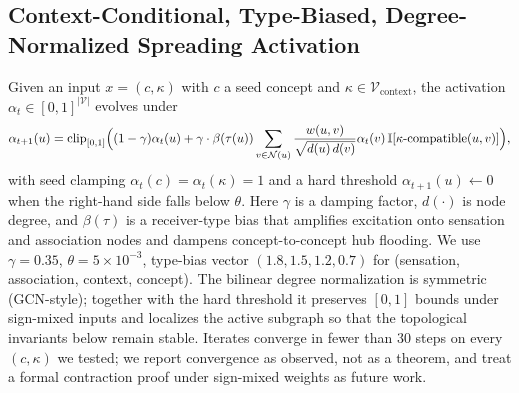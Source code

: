 \documentclass{article}
\begin{document}
\subsection{Context-Conditional, Type-Biased, Degree-Normalized Spreading
Activation}
Given an input $x = (c, \kappa)$ with $c$ a seed concept and
$\kappa \in \mathcal{V}_{\text{context}}$, the activation
$\alpha_t \in [0, 1]^{|\mathcal{V}|}$ evolves under
\begin{equation}
    \alpha_{t+1}(u) = \mathrm{clip}_{[0, 1]} \Bigl( (1 - \gamma)\alpha_t(u)
      + \gamma \cdot \beta(\tau(u)) \sum_{v \in \mathcal{N}(u)}
        \frac{w(u, v)}{\sqrt{d(u)\, d(v)}}
        \alpha_t(v)\, \mathbb{I}[\kappa\text{-compatible}(u,v)] \Bigr),
\end{equation}
with seed clamping $\alpha_t(c) = \alpha_t(\kappa) = 1$ and a hard threshold
$\alpha_{t+1}(u) \leftarrow 0$ when the right-hand side falls below $\theta$.
Here $\gamma$ is a damping factor, $d(\cdot)$ is node degree, and
$\beta(\tau)$ is a receiver-type bias that amplifies excitation onto
sensation and association nodes and dampens concept-to-concept hub flooding.
We use $\gamma = 0.35$, $\theta = 5 \times 10^{-3}$, type-bias vector
$(1.8, 1.5, 1.2, 0.7)$ for (sensation, association, context, concept). The
bilinear degree normalization is symmetric (GCN-style); together with the
hard threshold it preserves $[0,1]$ bounds under sign-mixed inputs and
localizes the active subgraph so that the topological invariants below
remain stable. Iterates converge in fewer than 30 steps on every
$(c, \kappa)$ we tested; we report convergence as observed, not as a
theorem, and treat a formal contraction proof under sign-mixed weights as
future work.
\end{document}

